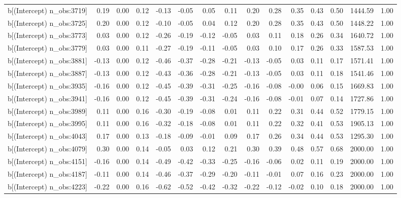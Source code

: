 \begin{table}[ht]
\begin{tabular}{rrrrrrrrrrrrrrr}
  b[(Intercept) n\_obs:3719] & 0.19 & 0.00 & 0.12 & -0.13 & -0.05 & 0.05 & 0.11 & 0.20 & 0.28 & 0.35 & 0.43 & 0.50 & 1444.59 & 1.00 \\ 
  b[(Intercept) n\_obs:3725] & 0.20 & 0.00 & 0.12 & -0.10 & -0.05 & 0.04 & 0.12 & 0.20 & 0.28 & 0.35 & 0.43 & 0.50 & 1448.22 & 1.00 \\ 
  b[(Intercept) n\_obs:3773] & 0.03 & 0.00 & 0.12 & -0.26 & -0.19 & -0.12 & -0.05 & 0.03 & 0.11 & 0.18 & 0.26 & 0.34 & 1640.72 & 1.00 \\ 
  b[(Intercept) n\_obs:3779] & 0.03 & 0.00 & 0.11 & -0.27 & -0.19 & -0.11 & -0.05 & 0.03 & 0.10 & 0.17 & 0.26 & 0.33 & 1587.53 & 1.00 \\ 
  b[(Intercept) n\_obs:3881] & -0.13 & 0.00 & 0.12 & -0.46 & -0.37 & -0.28 & -0.21 & -0.13 & -0.05 & 0.03 & 0.11 & 0.17 & 1571.41 & 1.00 \\ 
  b[(Intercept) n\_obs:3887] & -0.13 & 0.00 & 0.12 & -0.43 & -0.36 & -0.28 & -0.21 & -0.13 & -0.05 & 0.03 & 0.11 & 0.18 & 1541.46 & 1.00 \\ 
  b[(Intercept) n\_obs:3935] & -0.16 & 0.00 & 0.12 & -0.45 & -0.39 & -0.31 & -0.25 & -0.16 & -0.08 & -0.00 & 0.06 & 0.15 & 1669.83 & 1.00 \\ 
  b[(Intercept) n\_obs:3941] & -0.16 & 0.00 & 0.12 & -0.45 & -0.39 & -0.31 & -0.24 & -0.16 & -0.08 & -0.01 & 0.07 & 0.14 & 1727.86 & 1.00 \\ 
  b[(Intercept) n\_obs:3989] & 0.11 & 0.00 & 0.16 & -0.30 & -0.19 & -0.08 & 0.01 & 0.11 & 0.22 & 0.31 & 0.44 & 0.52 & 1779.15 & 1.00 \\ 
  b[(Intercept) n\_obs:3995] & 0.11 & 0.00 & 0.16 & -0.32 & -0.18 & -0.08 & 0.01 & 0.11 & 0.22 & 0.32 & 0.41 & 0.53 & 1905.13 & 1.00 \\ 
  b[(Intercept) n\_obs:4043] & 0.17 & 0.00 & 0.13 & -0.18 & -0.09 & -0.01 & 0.09 & 0.17 & 0.26 & 0.34 & 0.44 & 0.53 & 1295.30 & 1.00 \\ 
  b[(Intercept) n\_obs:4079] & 0.30 & 0.00 & 0.14 & -0.05 & 0.03 & 0.12 & 0.21 & 0.30 & 0.39 & 0.48 & 0.57 & 0.68 & 2000.00 & 1.00 \\ 
  b[(Intercept) n\_obs:4151] & -0.16 & 0.00 & 0.14 & -0.49 & -0.42 & -0.33 & -0.25 & -0.16 & -0.06 & 0.02 & 0.11 & 0.19 & 2000.00 & 1.00 \\ 
  b[(Intercept) n\_obs:4187] & -0.11 & 0.00 & 0.14 & -0.46 & -0.37 & -0.29 & -0.20 & -0.11 & -0.01 & 0.07 & 0.16 & 0.23 & 2000.00 & 1.00 \\ 
  b[(Intercept) n\_obs:4223] & -0.22 & 0.00 & 0.16 & -0.62 & -0.52 & -0.42 & -0.32 & -0.22 & -0.12 & -0.02 & 0.10 & 0.18 & 2000.00 & 1.00 \\ 

\end{tabular}
\end{table}
